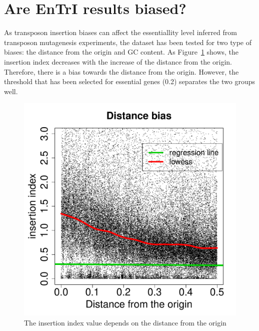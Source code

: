 \documentclass[a4paper,10pt, twocolumn]{article}
\begin{document}
\section{Are EnTrI results biased?}
As transposon insertion biases can affect the essentiallity level inferred from transposon mutagenesis experiments, the dataset has been tested for two type of biases: the distance from the origin and GC content. As Figure~\ref{fig:distance_bias} shows, the insertion index decreases with the increase of the distance from the origin. Therefore, there is a bias towards the distance from the origin. However, the threshold that has been selected for essential genes (0.2) separates the two groups well.
\begin{figure}[H]
\includegraphics[scale=0.3, page=1]{biases.pdf}
\caption{The insertion index value depends on the distance from the origin}
\label{fig:distance_bias}
\end{figure}
\end{document}
